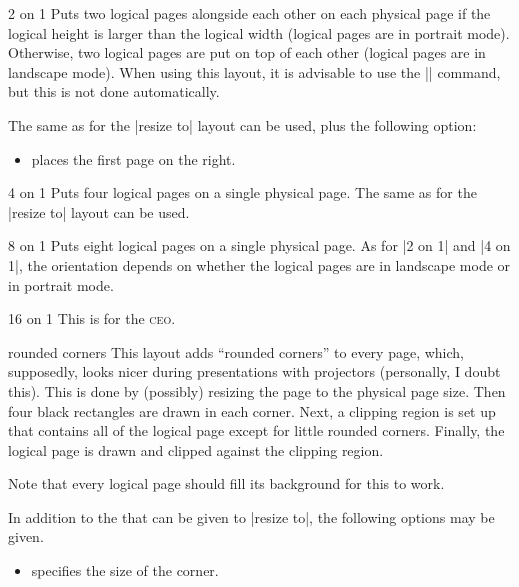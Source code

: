 \begin{pgflayout}{2 on 1}
  Puts two logical pages alongside each other on each physical page if
  the logical height is larger than the logical width (logical pages
  are in portrait mode). Otherwise, two
  logical pages are put on top of each other (logical pages are in
  landscape mode). When using this layout, it is advisable to use the
  |\nofiles| command, but this is not done automatically.

  The same  as for the |resize to| layout can be used,
  plus the following option:
  \begin{itemize}
  \item
    places the first page on the right.
  \end{itemize}
\end{pgflayout}


\begin{pgflayout}{4 on 1}
  Puts four logical pages on a single physical page.
  The same  as for the |resize to| layout can be used.
\end{pgflayout}

\begin{pgflayout}{8 on 1}
  Puts eight logical pages on a single physical page. As for |2 on 1| and |4 on 1|,
  the orientation depends on whether the logical pages are in
  landscape mode or in portrait mode.
\end{pgflayout}

\begin{pgflayout}{16 on 1}
  This is for the \textsc{ceo}.
\end{pgflayout}

\begin{pgflayout}{rounded corners}
  \label{layout-rounded-corners}
  This layout adds ``rounded corners'' to every page, which,
  supposedly, looks nicer during presentations with projectors
  (personally, I doubt this). This is done by (possibly) resizing the
  page to the physical page size. Then four black rectangles are
  drawn in each corner. Next, a clipping region is set up that
  contains all of the logical page except for little rounded
  corners. Finally, the logical page is drawn and clipped against the
  clipping region.

  Note that every logical page should fill its background for this to
  work.

  In addition to the  that can be given to |resize to|,
  the following options may be given.
  \begin{itemize}
    \item {} specifies the size of
    the corner.
  \end{itemize}

\end{pgflayout}

